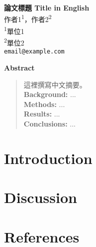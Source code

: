 \documentclass[12pt,a4paper]{article}
\newenvironment{abstract}{
  \begin{center}
    \bfseries Abstract
  \end{center}
  \begin{quote}
}{\end{quote}}
\begin{document}
\begin{center}
  {\LARGE \textbf{論文標題 Title in English}}\\[1.5em]
  {\large 作者1\textsuperscript{1}，作者2\textsuperscript{2}}\\[1em]
  {\small
    \textsuperscript{1}單位1 \\
    \textsuperscript{2}單位2 \\
    \texttt{email@example.com}
  }
\end{center}

\begin{abstract}
這裡撰寫中文摘要。\\
\textbf{Background:} ...\\
\textbf{Methods:} ...\\
\textbf{Results:} ...\\
\textbf{Conclusions:} ...
\end{abstract}

\section*{Introduction}


% 
% 
% 

\section*{Discussion}


\section*{References}
\printbibliography
\end{document}
